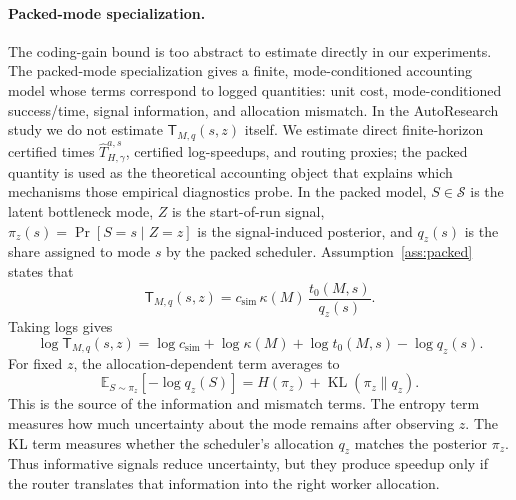 \documentclass{article}
\newcommand{\newtext}[1]{\textcolor{green!50!black}{#1}}
\DeclareMathOperator{\KL}{KL}
\newcommand{\cS}{\mathcal{S}}
\newcommand{\E}{\mathbb{E}}
\begin{document}
\paragraph{Packed-mode specialization.}
\newtext{The coding-gain bound is too abstract to estimate directly in our experiments. The packed-mode specialization gives a finite, mode-conditioned accounting model whose terms correspond to logged quantities: unit cost, mode-conditioned success/time, signal information, and allocation mismatch.}
\newtext{In the AutoResearch study we do not estimate \(\mathsf T_{M,q}(s,z)\) itself. We estimate direct finite-horizon certified times \(\widehat T^{a,s}_{H,\gamma}\), certified log-speedups, and routing proxies; the packed quantity is used as the theoretical accounting object that explains which mechanisms those empirical diagnostics probe.}
In the packed model, \(S\in\cS\) is the latent bottleneck mode, \(Z\) is the start-of-run
signal, \(\pi_z(s)=\Pr[S=s\mid Z=z]\) is the signal-induced posterior, and \(q_z(s)\)
is the share assigned to mode \(s\) by the packed scheduler.  Assumption~\ref{ass:packed}
states that
\[
    \mathsf T_{M,q}(s,z)
    =
    c_{\mathrm{sim}}\,
    \kappa(M)\,
    \frac{t_0(M,s)}{q_z(s)} .
\]
Taking logs gives
\[
    \log \mathsf T_{M,q}(s,z)
    =
    \log c_{\mathrm{sim}}
    +
    \log\kappa(M)
    +
    \log t_0(M,s)
    -
    \log q_z(s).
\]
For fixed \(z\), the allocation-dependent term averages to
\[
    \E_{S\sim\pi_z}[-\log q_z(S)]
    =
    H(\pi_z)+\KL(\pi_z\|q_z).
\]
This is the source of the information and mismatch terms.
\newtext{The entropy term measures how much uncertainty about the mode remains after observing \(z\). The KL term measures whether the scheduler's allocation \(q_z\) matches the posterior \(\pi_z\). Thus informative signals reduce uncertainty, but they produce speedup only if the router translates that information into the right worker allocation.}
\end{document}
